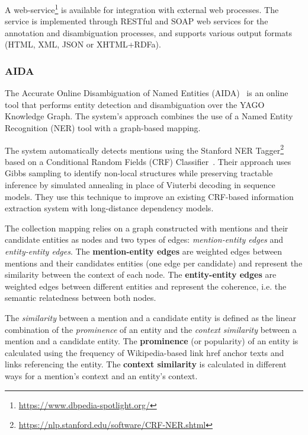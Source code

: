A web-service\footnote{\url{https://www.dbpedia-spotlight.org/}} is available for integration with 
external web processes. The service is implemented through RESTful and SOAP web services for 
the annotation and disambiguation processes, and supports various output formats (HTML, XML, 
JSON or XHTML+RDFa).

\subsubsection{AIDA}
\label{cap2:theoFrame/infExtr/entityLinking/aida}
The Accurate Online Disambiguation of Named Entities (AIDA)~\cite{EL:aida-HoffartYBFPSTTW11,EL:aida-tool-YosefHBSW11} 
is an online tool that performs entity detection and disambiguation over the YAGO Knowledge 
Graph. The system's approach combines the use of a Named Entity Recognition (NER) tool with a 
graph-based mapping. 

The system automatically detects mentions using the Stanford NER 
Tagger\footnote{\url{https://nlp.stanford.edu/software/CRF-NER.shtml}} based on a Conditional Random 
Fields (CRF) Classifier~\cite{entLin:FinkelGM05}. Their approach uses Gibbs sampling to identify 
non-local structures while preserving tractable inference by simulated annealing in place of 
Viuterbi decoding in sequence models. They use this technique to improve an existing CRF-based 
information extraction system with long-distance dependency models.

The collection mapping relies on a graph constructed with mentions and their candidate entities 
as nodes and two types of edges: \textit{mention-entity edges} and \textit{entity-entity edges}. 
The \textbf{mention-entity edges} are weighted edges between mentions and their candidates 
entities (one edge per candidate) and represent the similarity between the context of each node. 
The \textbf{entity-entity edges} are weighted edges between different entities and represent the 
coherence, i.e. the semantic relatedness between both nodes.

The \textit{similarity} between a mention and a candidate entity is defined as the linear 
combination of the \textit{prominence} of an entity and the \textit{context similarity} between 
a mention and a candidate entity. The \textbf{prominence} (or popularity) of an entity is 
calculated using the frequency of Wikipedia-based link href anchor texts and links referencing 
the entity. The \textbf{context similarity} is calculated in different ways for a mention's 
context and an entity's context. 

